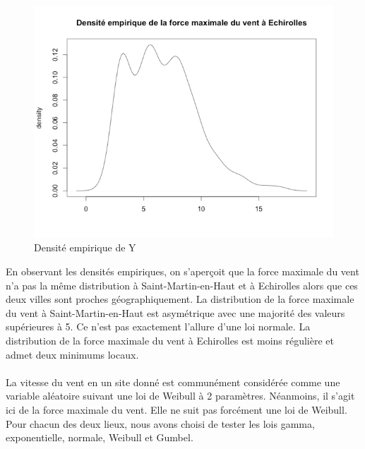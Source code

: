 \noindent%
\begin{figure}[H]
    \begin{center}
      \includegraphics[width=12 cm, angle=0]{./pictures/densityy.png}
      \centering\caption{\label{2} Densité empirique de Y}
    \end{center}
\end{figure}

En observant les densités empiriques, on s'aperçoit que la force maximale du vent n'a pas la même distribution à Saint-Martin-en-Haut et à Echirolles alors que ces deux villes sont proches géographiquement.
La distribution de la force maximale du vent à Saint-Martin-en-Haut est asymétrique avec une majorité des valeurs supérieures à 5. Ce n'est pas exactement l'allure d'une loi normale. La distribution de la force maximale du vent à Echirolles est moins régulière et admet deux minimums locaux.
\\ \\
La vitesse du vent en un site donné est communément considérée comme une variable aléatoire suivant une loi de Weibull à 2 paramètres. Néanmoins, il s'agit ici de la force maximale du vent. Elle ne suit pas forcément une loi de Weibull. 
Pour chacun des deux lieux, nous avons choisi de tester les lois gamma, exponentielle, normale, Weibull et Gumbel.


